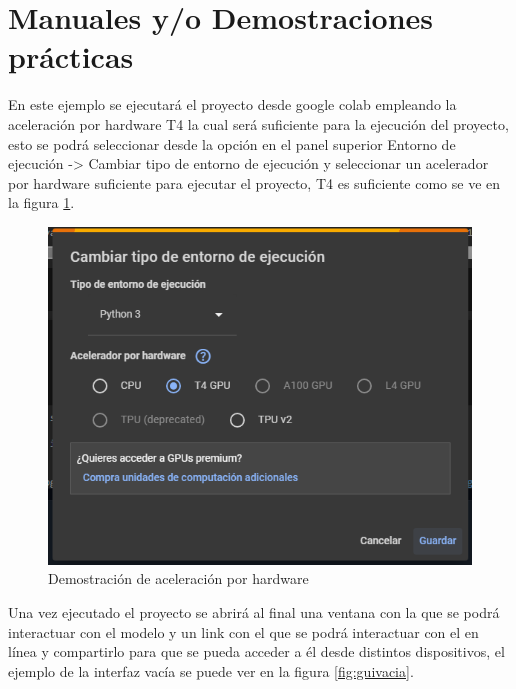 \section{Manuales y/o Demostraciones prácticas}

En este ejemplo se ejecutará el proyecto desde google colab empleando la aceleración por hardware T4 la cual será suficiente para la ejecución del proyecto, esto se podrá seleccionar desde la opción en el panel superior Entorno de ejecución -> Cambiar tipo de entorno de ejecución  y seleccionar un acelerador por hardware suficiente para ejecutar el proyecto, T4 es suficiente como se ve en la figura \ref{fig:aceleracion}.


\begin{figure}[h!]
    \centering
    \includegraphics[width=1\textwidth]{img/aceleracion.png}
    \caption{Demostración de aceleración por hardware}
    \label{fig:aceleracion}
\end{figure}


Una vez ejecutado el proyecto se abrirá al final una ventana con la que se podrá interactuar con el modelo y un link con el que se podrá interactuar con el en línea y compartirlo para que se pueda acceder a él desde distintos dispositivos, el ejemplo de la interfaz vacía se puede ver en la figura \ref{fig:guivacia}.


